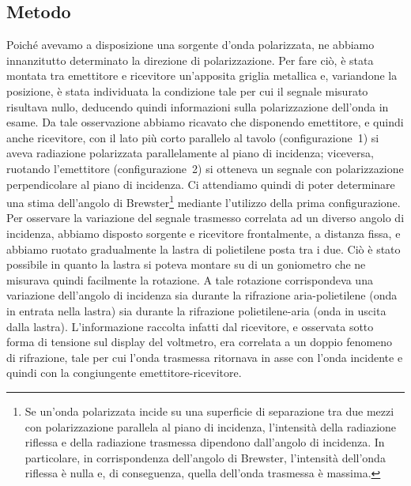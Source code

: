 \documentclass[a4paper]{article}
\begin{document}
\subsection{Metodo}
Poiché avevamo a disposizione una sorgente d'onda polarizzata, ne abbiamo innanzitutto determinato la direzione di polarizzazione. Per fare ciò, è stata montata tra emettitore e ricevitore un'apposita griglia metallica e, variandone la posizione, è stata individuata la condizione tale per cui il segnale misurato risultava nullo, deducendo quindi informazioni sulla polarizzazione dell'onda in esame. Da tale osservazione abbiamo ricavato che disponendo emettitore, e quindi anche ricevitore, con il lato più corto parallelo al tavolo (configurazione~1) si aveva radiazione polarizzata parallelamente al piano di incidenza; viceversa, ruotando l'emettitore (configurazione~2) si otteneva un segnale con polarizzazione perpendicolare al piano di incidenza. Ci attendiamo quindi di poter determinare una stima dell'angolo di Brewster\footnote{Se un'onda polarizzata incide su una superficie di separazione tra due mezzi con polarizzazione parallela al piano di incidenza, l'intensità della radiazione riflessa e della radiazione trasmessa dipendono dall'angolo di incidenza. In particolare, in corrispondenza dell'angolo di Brewster, l'intensità dell'onda riflessa è nulla e, di conseguenza, quella dell'onda trasmessa è massima.} mediante l'utilizzo della prima configurazione.
Per osservare la variazione del segnale trasmesso correlata ad un diverso angolo di incidenza, abbiamo disposto sorgente e ricevitore frontalmente, a distanza fissa, e abbiamo ruotato gradualmente la lastra di polietilene posta tra i due. Ciò è stato possibile in quanto la lastra si poteva montare su di un goniometro che ne misurava quindi facilmente la rotazione. A tale rotazione corrispondeva una variazione dell'angolo di incidenza sia durante la rifrazione aria-polietilene (onda in entrata nella lastra) sia durante la rifrazione polietilene-aria (onda in uscita dalla lastra). L'informazione raccolta infatti dal ricevitore, e osservata sotto forma di tensione sul display del voltmetro, era correlata a un doppio fenomeno di rifrazione, tale per cui l'onda trasmessa ritornava in asse con l'onda incidente e quindi con la congiungente emettitore-ricevitore. 
\end{document}
